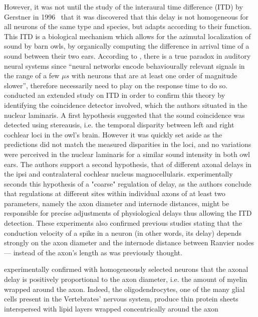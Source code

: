 \documentclass[brainsci, %
               review,submit,pdftex,moreauthors
               ]{Definitions/mdpi}
\begin{document}
However, it was not until the study of the interaural time difference (ITD) by Gerstner in 1996~\citep{gerstner_neuronal_1996} that it was discovered that this delay is not homogeneous for all neurons of the same type and species, but adapts according to their function. This ITD is a biological mechanism which allows for the azimutal localization of sound by barn owls, by organically computing the difference in arrival time of a sound between their two ears. According to \citep{gerstner_neuronal_1996}, there is a true paradox in auditory neural systems since “neural networks encode behaviourally relevant signals in the range of a few $\mu s$ with neurons that are at least one order of magnitude slower”, therefore necessarily need to play on the response time to do so. \citet{pena_2001} conducted an extended study on ITD in order to confirm this theory by identifying the coincidence detector involved, which the authors situated in the nuclear laminaris. A first hypothesis suggested that the sound coincidence was detected using stereausis, i.e. the temporal disparity between left and right cochlear loci in the owl's brain. However it was quickly set aside as the predictions did not match the measured disparities in the loci, and no variations were perceived in the nuclear laminaris for a similar sound intensity in both owl ears. The authors support a second hypothesis, that of different axonal delays in the ipsi and contralateral cochlear nucleus magnocellularis. \citet{seidl_mechanisms_2010} experimentally seconds this hypothesis of a "coarse" regulation of delay, as the authors conclude that regulations at different sites within individual axons of at least two parameters, namely the axon diameter and internode distances, might be responsible for precise adjustments of physiological delays thus allowing the ITD detection. These experiments also confirmed previous studies stating that the conduction velocity of a spike in a neuron (in other words, its delay) depends strongly on the axon diameter \cite{gasser_1939} and the internode distance between Ranvier nodes \cite{brills_1977} --- instead of the axon's length as was previously thought. 


\citet{gasser_1939} experimentally confirmed with homogeneously selected neurons that the axonal delay is positively proportional to the axon diameter, i.e. the amount of myelin wrapped around the axon. Indeed, the oligodendrocytes, one of the many glial cells present in the Vertebrates' nervous system, produce thin protein sheets interspersed with lipid layers wrapped concentrically around the axon \citep{schmidt_1939}
\end{document}
